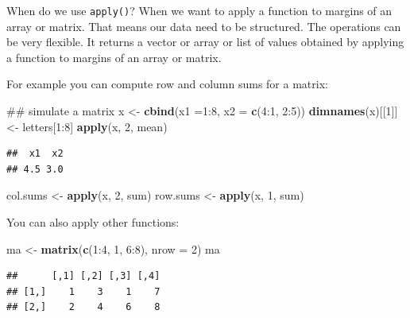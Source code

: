 \documentclass[]{book}
\newenvironment{Shaded}{\begin{snugshade}}{\end{snugshade}}
\newcommand{\KeywordTok}[1]{\textcolor[rgb]{0.13,0.29,0.53}{\textbf{{#1}}}}
\newcommand{\DataTypeTok}[1]{\textcolor[rgb]{0.13,0.29,0.53}{{#1}}}
\newcommand{\DecValTok}[1]{\textcolor[rgb]{0.00,0.00,0.81}{{#1}}}
\newcommand{\StringTok}[1]{\textcolor[rgb]{0.31,0.60,0.02}{{#1}}}
\newcommand{\NormalTok}[1]{{#1}}
\theoremstyle{definition}
\theoremstyle{definition}
\theoremstyle{remark}
\begin{document}
When do we use \texttt{apply()}? When we want to apply a function to
margins of an array or matrix. That means our data need to be
structured. The operations can be very flexible. It returns a vector or
array or list of values obtained by applying a function to margins of an
array or matrix.

For example you can compute row and column sums for a matrix:

\begin{Shaded}
\begin{Highlighting}[]
\NormalTok{## simulate a matrix}
\NormalTok{x <-}\StringTok{ }\KeywordTok{cbind}\NormalTok{(}\DataTypeTok{x1 =}\DecValTok{1}\NormalTok{:}\DecValTok{8}\NormalTok{, }\DataTypeTok{x2 =} \KeywordTok{c}\NormalTok{(}\DecValTok{4}\NormalTok{:}\DecValTok{1}\NormalTok{, }\DecValTok{2}\NormalTok{:}\DecValTok{5}\NormalTok{))}
\KeywordTok{dimnames}\NormalTok{(x)[[}\DecValTok{1}\NormalTok{]] <-}\StringTok{ }\NormalTok{letters[}\DecValTok{1}\NormalTok{:}\DecValTok{8}\NormalTok{]}
\KeywordTok{apply}\NormalTok{(x, }\DecValTok{2}\NormalTok{, mean)}
\end{Highlighting}
\end{Shaded}

\begin{verbatim}
##  x1  x2 
## 4.5 3.0
\end{verbatim}

\begin{Shaded}
\begin{Highlighting}[]
\NormalTok{col.sums <-}\StringTok{ }\KeywordTok{apply}\NormalTok{(x, }\DecValTok{2}\NormalTok{, sum)}
\NormalTok{row.sums <-}\StringTok{ }\KeywordTok{apply}\NormalTok{(x, }\DecValTok{1}\NormalTok{, sum)}
\end{Highlighting}
\end{Shaded}

You can also apply other functions:

\begin{Shaded}
\begin{Highlighting}[]
\NormalTok{ma <-}\StringTok{ }\KeywordTok{matrix}\NormalTok{(}\KeywordTok{c}\NormalTok{(}\DecValTok{1}\NormalTok{:}\DecValTok{4}\NormalTok{, }\DecValTok{1}\NormalTok{, }\DecValTok{6}\NormalTok{:}\DecValTok{8}\NormalTok{), }\DataTypeTok{nrow =} \DecValTok{2}\NormalTok{)}
\NormalTok{ma}
\end{Highlighting}
\end{Shaded}

\begin{verbatim}
##      [,1] [,2] [,3] [,4]
## [1,]    1    3    1    7
## [2,]    2    4    6    8
\end{verbatim}
\end{document}
